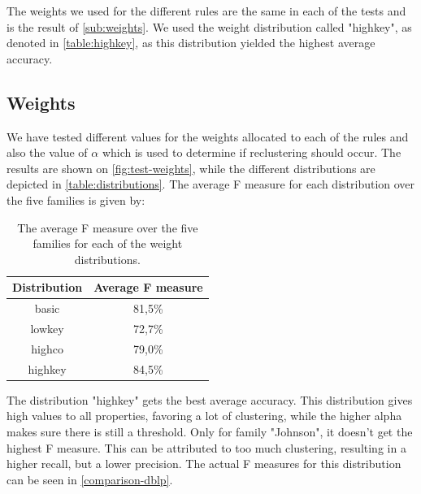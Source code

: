 The weights we used for the different rules are the same in each of the tests and is the result of \autoref{sub:weights}. We used the weight distribution called "highkey", as denoted in \autoref{table:highkey}, as this distribution yielded the highest average accuracy.



\subsection{Weights}
\label{sub:weights}

We have tested different values for the weights allocated to each of the rules and also the value of $\alpha$ which is used to determine if reclustering should occur. The results are shown on \autoref{fig:test-weights}, while the different distributions are depicted in \autoref{table:distributions}. The average F measure for each distribution over the five families is given by:

\begin{table}[ht]
	\center
	\begin{tabular}{|c|c|}
		\hline
		\bfseries{Distribution} & \bfseries{Average F measure} \\
		\hline
		basic & 81,5\% \\
		\hline
		lowkey & 72,7\% \\
		\hline
		highco & 79,0\% \\
		\hline
		highkey & 84,5\% \\
		\hline
	\end{tabular}
	\caption{The average F measure over the five families for each of the weight distributions.}
	\label{table:avg-f-distr}
\end{table}

The distribution "highkey" gets the best average accuracy. This distribution gives high values to all properties, favoring a lot of clustering, while the higher alpha makes sure there is still a threshold. Only for family "Johnson", it doesn't get the highest F measure. This can be attributed to too much clustering, resulting in a higher recall, but a lower precision. The actual F measures for this distribution can be seen in \autoref{comparison-dblp}.

